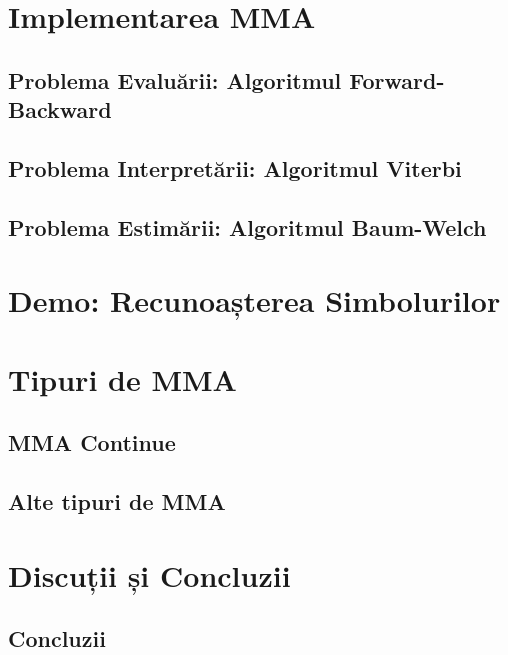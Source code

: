 \documentclass{beamer}
\begin{document}


\section{Implementarea MMA}
\label{sec:implementation}

\subsection{Problema Evaluării: Algoritmul Forward-Backward }
\label{sec:forward-backward}



\subsection{Problema Interpretării: Algoritmul Viterbi}
\label{sec:viterbi}



\subsection{Problema Estimării: Algoritmul Baum-Welch}
\label{sec:baum-welch}



\section{Demo: Recunoașterea Simbolurilor}
\label{sec:symbol-recognition}



\section{Tipuri de MMA}
\label{sec:hmm-types}

\subsection*{MMA Continue}
\label{sec:contin}



\subsection*{Alte tipuri de MMA}
\label{sec:contin}



\section{Discuții și Concluzii}
\label{sec:closing}

\subsection*{Concluzii}
\label{Concl}


\end{document}

